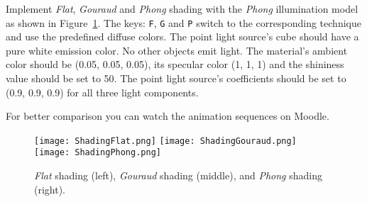\documentclass[12pt, a4paper, oneside, ngerman]{article}
\begin{document}
Implement \textit{Flat}, \textit{Gouraud} and \textit{Phong} shading with the \textit{Phong} illumination model as shown in Figure~\ref{fig:shading}. The keys: \texttt{F}, \texttt{G} and \texttt{P} switch to the corresponding technique and use the predefined diffuse colors.
The point light source's cube should have a pure white emission color. No other objects emit light.
The material's ambient color should be (0.05, 0.05, 0.05), its specular color (1, 1, 1) and the shininess value should be set to 50.
The point light source's coefficients should be set to (0.9, 0.9, 0.9) for all three light components.

For better comparison you can watch the animation sequences on Moodle.

\begin{figure}
  \centering
  \texttt{[image: ShadingFlat.png]}
  \texttt{[image: ShadingGouraud.png]}
  \texttt{[image: ShadingPhong.png]}
  \caption{\textit{Flat} shading (left), \textit{Gouraud} shading (middle), and \textit{Phong} shading (right).}
  \label{fig:shading}
\end{figure}
\end{document}
